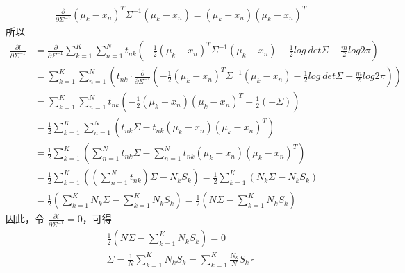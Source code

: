 \documentclass{article}
\begin{document}
\begin{align*}
    \frac{\partial}{\partial \Sigma^{-1}} (\mu_k - x_n)^T \Sigma^{-1} (\mu_k - x_n) = (\mu_k - x_n) (\mu_k - x_n)^T
\end{align*}
所以
\begin{align*}
    \frac{\partial l}{\partial \Sigma^{-1}} &= \frac{\partial}{\partial \Sigma^{-1}} \sum_{k = 1}^K \sum_{n = 1}^N t_{nk} (-\frac{1}{2} (\mu_k - x_n)^T \Sigma^{-1} (\mu_k - x_n) - \frac{1}{2} log\ det \Sigma - \frac{m}{2} log 2 \pi)\\
    &= \sum_{k = 1}^K \sum_{n = 1}^N (t_{nk} \cdot \frac{\partial}{\partial \Sigma^{-1}} (-\frac{1}{2} (\mu_k - x_n)^T \Sigma^{-1} (\mu_k - x_n) - \frac{1}{2} log\ det \Sigma - \frac{m}{2} log 2 \pi))\\
    &= \sum_{k = 1}^K \sum_{n = 1}^N t_{nk} (-\frac{1}{2} (\mu_k - x_n) (\mu_k - x_n)^T - \frac{1}{2} (-\Sigma))\\
    &= \frac{1}{2} \sum_{k = 1}^K \sum_{n = 1}^N (t_{nk} \Sigma - t_{nk} (\mu_k - x_n) (\mu_k - x_n)^T)\\
    &= \frac{1}{2} \sum_{k = 1}^K (\sum_{n = 1}^N t_{nk} \Sigma - \sum_{n = 1}^N t_{nk} (\mu_k - x_n) (\mu_k - x_n)^T)\\
    &= \frac{1}{2} \sum_{k = 1}^K ((\sum_{n = 1}^N t_{nk}) \Sigma - N_k S_k) = \frac{1}{2} \sum_{k = 1}^K (N_k \Sigma - N_k S_k)\\
    &= \frac{1}{2} (\sum_{k = 1}^K N_k \Sigma - \sum_{k = 1}^K N_k S_k) = \frac{1}{2} (N \Sigma - \sum_{k = 1}^K N_k S_k)
\end{align*}
因此，令 $\frac{\partial l}{\partial \Sigma^{-1}} = 0$，可得
\begin{gather*}
    \frac{1}{2} (N \Sigma - \sum_{k = 1}^K N_k S_k) = 0\\
    \Sigma = \frac{1}{N} \sum_{k = 1}^K N_k S_k = \sum_{k = 1}^K \frac{N_k}{N} S_k\ \square
\end{gather*}
\end{document}
